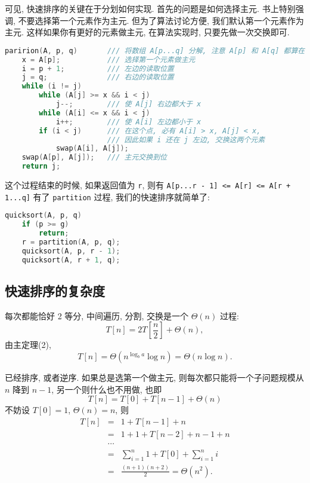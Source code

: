 \documentclass[a4paper]{ctexart}
\theoremstyle{definition}
\theoremstyle{definition}
\begin{document}
可见, 快速排序的关键在于分划如何实现. 首先的问题是如何选择主元.
书上特别强调, 不要选择第一个元素作为主元. 但为了算法讨论方便,
我们默认第一个元素作为主元. 这样如果你有更好的元素做主元,
在算法实现时, 只要先做一次交换即可.


\begin{lstlisting}[language=C++]
paririon(A, p, q)       /// 将数组 A[p...q] 分解, 注意 A[p] 和 A[q] 都算在内.
    x = A[p];           /// 选择第一个元素做主元
	i = p + 1;          /// 左边的读取位置 
	j = q;              /// 右边的读取位置
	while (i != j)
		while (A[j] >= x && i < j)
			j--;        /// 使 A[j] 右边都大于 x
		while (A[i] <= x && i < j)
			i++;        /// 使 A[i] 左边都小于 x
		if (i < j)      /// 在这个点, 必有 A[i] > x, A[j] < x,
	                    /// 因此如果 i 还在 j 左边, 交换这两个元素
            swap(A[i], A[j]);
	swap(A[p], A[j]);   /// 主元交换到位
	return j;
\end{lstlisting}

这个过程结束的时候, 如果返回值为 \verb|r|, 则有\newline 
\verb|A[p...r - 1] <= A[r] <= A[r + 1...q]|\newline
有了 \verb|partition| 过程, 我们的快速排序就简单了:

\begin{lstlisting}[language=C++]
quicksort(A, p, q)
	if (p >= g)
		return;
	r = partition(A, p, q);
	quicksort(A, p, r - 1);
	quicksort(A, r + 1, q);
\end{lstlisting}

\subsection{快速排序的复杂度}

 每次都能恰好 2 等分, 中间遍历, 分割,
交换是一个 $\Theta(n)$ 过程: 
$$ 
T[n] = 2T[\frac{n}{2}] + \Theta(n), 
$$
由主定理(2), 
$$ 
T[n] = \Theta(n^{\log_ba}\log n) = \Theta(n\log n).  
$$

 已经排序, 或者逆序. 如果总是选第一个做主元,
则每次都只能将一个子问题规模从 $n$ 降到 $n - 1$, 另一个则什么也不用做,
也即
$$
T[n] = T[0] + T[n - 1] + \Theta(n)
$$
不妨设 $T[0] = 1$, $\Theta(n) = n$, 则
$$
\begin{array}{rcl}
T[n] &=& 1 + T[n - 1] + n \\
&=& 1 + 1 + T[n - 2] + n - 1 + n \\
&\cdots&\\
&=& \sum_{i = 1}^{n} 1 + T[0] + \sum_{i = 1}^n i \\
&=& \frac{(n + 1)(n + 2)}{2} = \Theta(n^2).
\end{array}
$$
\end{document}

